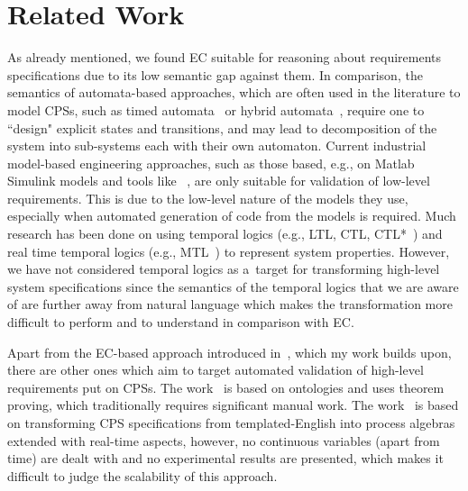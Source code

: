 \section{Related Work}

As already mentioned, we found EC suitable for reasoning about requirements specifications due to its low semantic gap against them.
%
In comparison, the semantics of automata-based approaches, which are often used in the literature to model CPSs, such as timed automata~\cite{timed-automata-uppaal} or hybrid automata~\cite{hybrid-automata}, require one to ``design" explicit states and transitions, and may lead to decomposition of the system into sub-systems each with their own automaton.
%
Current industrial model-based engineering approaches, such as those based, e.g., on Matlab Simulink models and tools like \hilite{}~\cite{hilite}, are only suitable for validation of low-level requirements.
%
This is due to the low-level nature of the models they use, especially when automated generation of code from the models is required.
%
Much research has been done on using temporal logics (e.g., LTL, CTL, CTL*~\cite{hand-book-modelchecking}) and real time temporal logics (e.g., MTL~\cite{temporal-logic-mtl}) to represent system properties.
%
However, we have not considered temporal logics as a~target for transforming high-level system specifications since the semantics of the temporal logics that we are aware of are further away from natural language which makes the transformation more difficult to perform and to understand in comparison with EC.

Apart from the EC-based approach introduced in~\cite{gupta-train}, which my work builds upon, 
there are other ones which aim to target automated validation of high-level requirements put on CPSs.
%
The work~\cite{ge-assert} is based on ontologies and uses theorem proving, which traditionally requires significant manual work.
%
The work~\cite{cea-glossaries-and-process-algebras} is based on transforming CPS specifications from templated-English
%
into process algebras extended with real-time aspects, however, no continuous variables (apart from time) are dealt with and no experimental results are presented, which makes it difficult to judge the scalability of this approach.

